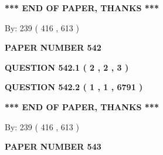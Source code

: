 \documentclass[12pt]{article}
\begin{document}
  
   
   
 \vspace{0.2in}
 
   
   
   
   
\vspace{1.0in} 
{\textbf{\large{ *** END OF PAPER, THANKS *** }}} 
   
   
\hspace{1.0in} By: 
 239 ( 416 ,  613 )
   
   
   
   
\newpage 
\setcounter{page}{ 
   542001 } 
   
   
   
   
 {\textbf{ \Large{ PAPER NUMBER  542  }}}
   
   
\vspace{0.2in}
   
   
   
   
   
   
 \vspace{0.2in}
 
 
 
 
   
   
  
\vspace{0.2in}
  
{\textbf{\Large{QUESTION
542.1 
 ( 2 , 2 , 3 )
}}}
  
  
  
\vspace{0.2in}
  
{\textbf{\Large{QUESTION
542.2 
 ( 1 , 1 , 6791 )
}}}
  
  
   
   
 \vspace{0.2in}
 
   
   
   
   
\vspace{1.0in} 
{\textbf{\large{ *** END OF PAPER, THANKS *** }}} 
   
   
\hspace{1.0in} By: 
 239 ( 416 ,  613 )
   
   
   
   
\newpage 
\setcounter{page}{ 
   543001 } 
   
   
   
   
 {\textbf{ \Large{ PAPER NUMBER  543  }}}
   
\end{document}
